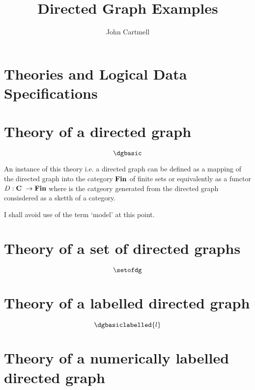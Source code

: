 \documentclass[10pt,a4paper]{article}
\theoremstyle{remark}
\begin{document}
\title{Directed Graph Examples}


\author{John Cartmell}

\date{}



\section{Theories and Logical Data Specifications}

\section*{Theory of a directed graph}
\begin{displaymath}
\dgbasic
\end{displaymath}

An instance of this theory i.e. a directed graph can be defined 
as a mapping of the directed graph into the category
$\textbf{Fin}$ of finite sets or equivalently as a functor $D: \textbf{C}\  \rightarrow \textbf{Fin}$
where \catcw is the catgeory generated from the directed graph consisdered as a sketth
of a category.

I shall avoid use of the term `model' at this point.

\section*{Theory of a set of directed graphs}
\begin{displaymath}
\setofdg
\end{displaymath}

\section*{Theory of a labelled directed graph}

\begin{displaymath}
\dgbasiclabelled{l}
\end{displaymath}


\section*{Theory of a numerically labelled directed graph}
\end{document}

